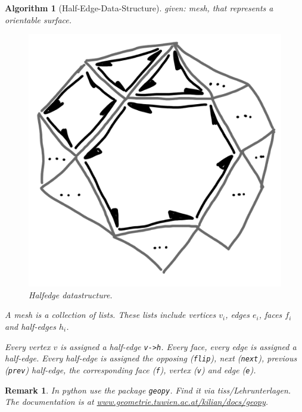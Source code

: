 \documentclass[]{article}
\newtheorem{algorithm}{Algorithm}
\newtheorem{remark}{Remark}
\begin{document}
\begin{algorithm}[Half-Edge-Data-Structure]
	given: mesh, that represents a orientable surface.
	
	\begin{figure}[h!]
		\centering
		\includegraphics[width=0.3\linewidth]{figures/halfedge}
		\caption{Halfedge datastructure.}
		\label{fig:halfedge}
	\end{figure}
	
	A mesh is a collection of lists. These lists include vertices $v_i$, edges $e_i$, faces $f_i$ and half-edges $h_i$.
	
	Every vertex $v$ is assigned a half-edge \texttt{v->h}. Every face, every edge is assigned a half-edge. Every half-edge is assigned the opposing (\texttt{flip}), next (\texttt{next}), previous (\texttt{prev}) half-edge, the corresponding face (\texttt{f}), vertex (\texttt{v}) and edge (\texttt{e}).
\end{algorithm}

\begin{remark}
	In python use the package \texttt{geopy}. Find it via tiss/Lehrunterlagen. The documentation is at \url{www.geometrie.tuwien.ac.at/kilian/docs/geopy}.
\end{remark}
\end{document}
